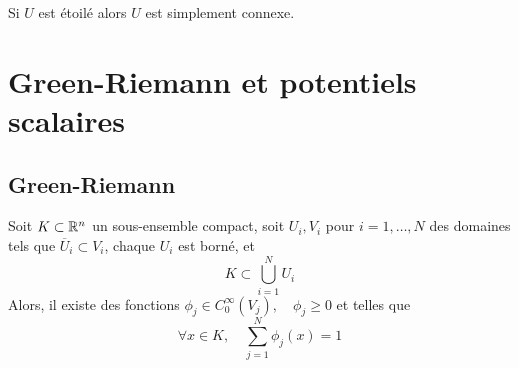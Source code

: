 \begin{lemme}
	Si $U$ est étoilé alors $U$ est simplement connexe.
\end{lemme}



\section{Green-Riemann et potentiels scalaires}

\subsection{Green-Riemann}
\begin{proposition} \label{prop: Partition de l'unité}
	Soit $K \subset \mathbb{R}^n$ un sous-ensemble compact, soit $U_i, V_i$ pour $i = 1, \ldots, N$ des domaines tels que $\overline U_i \subset V_i$, chaque $U_i$ est borné, et 
	\[
	K \subset \bigcup_{i=1}^N U_i
	\]
	Alors, il existe des fonctions $\phi_j \in C^\infty_0(V_j), \quad \phi_j \geqslant 0$ et telles que
	\[
	\forall x \in K, \quad \sum_{j=1}^N \phi_j(x) = 1
	\]
\end{proposition}


